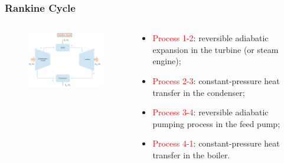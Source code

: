 \documentclass[10pt,compress]{beamer}
\begin{document}
\begin{frame}
 \frametitle{Rankine Cycle}
 \begin{columns}
   \begin{column}[c]{0.6\linewidth}
    \begin{figure}%
     \begin{center}
      \includegraphics[width=7.5cm,clip]{./Pics/Simple_Rankine_Cycle}
     \end{center}
    \end{figure}  
   \end{column}
   \begin{column}[l]{0.4\linewidth}
     \begin{itemize}%
      \item <3-> \textcolor{red}{Process 1-2}: reversible adiabatic expansion in the turbine (or steam engine);
      \item <4-> \textcolor{red}{Process 2-3}: constant-pressure heat transfer in the condenser;
      \item <5-> \textcolor{red}{Process 3-4}: reversible adiabatic pumping process in the feed pump;
      \item <6-> \textcolor{red}{Process 4-1}: constant-pressure heat transfer in the boiler.  
     \end{itemize}
   \end{column}
  \end{columns}
 \normalsize
\end{frame}
\end{document}
